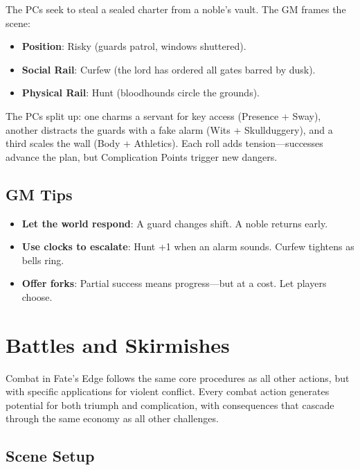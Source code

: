 The PCs seek to steal a sealed charter from a noble's vault. The GM frames the scene:

\begin{itemize}
    \item \textbf{Position}: Risky (guards patrol, windows shuttered).
    \item \textbf{Social Rail}: Curfew (the lord has ordered all gates barred by dusk).
    \item \textbf{Physical Rail}: Hunt (bloodhounds circle the grounds).
\end{itemize}

The PCs split up: one charms a servant for key access (Presence + Sway), another distracts the guards with a fake alarm (Wits + Skullduggery), and a third scales the wall (Body + Athletics). Each roll adds tension---successes advance the plan, but Complication Points trigger new dangers.

\subsection*{GM Tips}

\begin{itemize}
    \item \textbf{Let the world respond}: A guard changes shift. A noble returns early.
    \item \textbf{Use clocks to escalate}: Hunt +1 when an alarm sounds. Curfew tightens as bells ring.
    \item \textbf{Offer forks}: Partial success means progress---but at a cost. Let players choose.
\end{itemize}

\section*{Battles and Skirmishes}

Combat in Fate's Edge follows the same core procedures as all other actions, but with specific applications for violent conflict. Every combat action generates potential for both triumph and complication, with consequences that cascade through the same economy as all other challenges.

\subsection*{Scene Setup}

